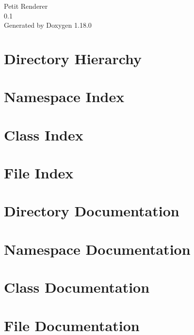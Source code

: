 \documentclass[twoside]{book}
\newcommand{\+}{\discretionary{\mbox{\scriptsize$\hookleftarrow$}}{}{}}
\newcommand{\clearemptydoublepage}{%
    \newpage{\pagestyle{empty}\cleardoublepage}%
  }
\begin{document}
  \raggedbottom
    \hypersetup{pageanchor=false,
                bookmarksnumbered=true,
                pdfencoding=unicode
               }
  \begin{titlepage}
  \vspace*{7cm}
  \begin{center}%
  {\Large Petit Renderer}\\
  [1ex]\large 0.\+1 \\
  \vspace*{1cm}
  {\large Generated by Doxygen 1.18.0}\\
  \end{center}
  \end{titlepage}
  \clearemptydoublepage
  \tableofcontents
  \clearemptydoublepage
  \hypersetup{pageanchor=true}
\chapter{Directory Hierarchy}

\chapter{Namespace Index}

\chapter{Class Index}

\chapter{File Index}

\chapter{Directory Documentation}


\chapter{Namespace Documentation}


\chapter{Class Documentation}


\chapter{File Documentation}






  \backmatter
  \newpage
  \clearemptydoublepage
  \printindex
\end{document}
